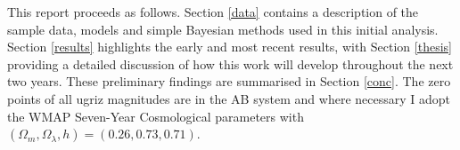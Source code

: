 \documentclass{mn2e}
\begin{document}




This report proceeds as follows. Section \ref{data} contains a description of the sample data, models and simple Bayesian methods used in this initial analysis. Section \ref{results} highlights the early and most recent results, with Section \ref{thesis} providing a detailed discussion of how this work will develop throughout the next two years. These preliminary findings are summarised in Section \ref{conc}. The zero points of all ugriz magnitudes are in the AB system and where necessary I adopt the WMAP Seven-Year Cosmological parameters \citep{WMAP} with $(\Omega_m, \Omega_{\lambda}, h) = (0.26, 0.73, 0.71)$. 
\end{document}
